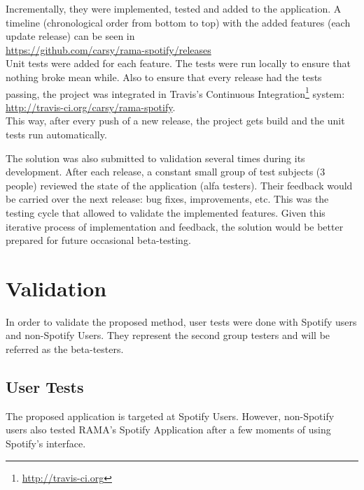     Incrementally, they were implemented, tested and added to the application.
    A timeline (chronological order from bottom to top) with the added features (each update release) can be seen in \\ 
    \indent \url{https://github.com/carsy/rama-spotify/releases} \\

    Unit tests were added for each feature.
    The tests were run locally to ensure that nothing broke mean while.
    Also to ensure that every release had the tests passing, the project was integrated in Travis's Continuous Integration\footnote{\url{http://travis-ci.org}} system: \\
    \indent \url{http://travis-ci.org/carsy/rama-spotify}. \\

    This way, after every push of a new release, the project gets build and the unit tests run automatically.

    The solution was also submitted to validation several times during its development.
    After each release, a constant small group of test subjects (3 people) reviewed the state of the application (alfa testers).
    Their feedback would be carried over the next release: bug fixes, improvements, etc.
    This was the testing cycle that allowed to validate the implemented features.
    Given this iterative process of implementation and feedback, the solution would be better prepared for future occasional beta-testing.

    




\section{Validation} %
\label{sec:validation}

  In order to validate the proposed method, user tests were done with Spotify users and non-Spotify Users.
  They represent the second group testers and will be referred as the beta-testers.

  \subsection{User Tests} %
  \label{sub:user_tests}

    The proposed application is targeted at Spotify Users.
    However, non-Spotify users also tested RAMA's Spotify Application after a few moments of using Spotify's interface.

